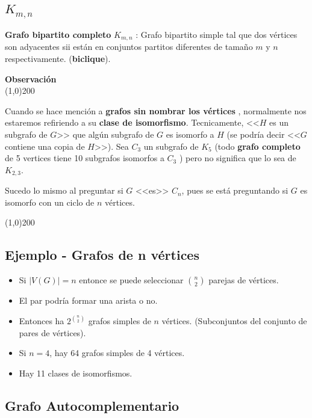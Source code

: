 \documentclass[a4paper]{book}
\newenvironment{obs}
    {
        \begin{flushleft}
       \textbf{Observación}\\
        \line(1,0){200} \\
        \end{flushleft}
    }
    {
        \begin{flushright}
        \line(1,0){200}
        \end{flushright}
    }
\begin{document}
\subsection{\(K_{m,n}\)}
\label{ssec:kmn}

\textbf{Grafo bipartito completo} \(K_{m,n}\) : Grafo bipartito simple tal que dos vértices son adyacentes sii están en conjuntos partitos diferentes de tamaño \(m\) y \(n\) respectivamente. (\textbf{biclique}).

\begin{obs}
    Cuando se hace mención a \textbf{grafos sin nombrar los vértices} ,
    normalmente nos estaremos refiriendo a su \textbf{clase de isomorfismo}.
    Tecnicamente, <<\(H\) es un subgrafo de \(G\)>> que algún subgrafo  de \(G\)
    es isomorfo a \(H\) (se podría decir <<\(G\) contiene una copia de
    \(H\)>>). Sea \(C_3\)  un subgrafo de \(K_5\) (todo \textbf{grafo completo}
    de 5 vertices tiene 10 subgrafos isomorfos a \(C_3\) ) pero no significa
    que lo sea de \(K_{2,3}\).

    Sucedo lo mismo al preguntar si \(G\) <<es>> \(C_{n}\), pues se está
    preguntando si \(G\) es isomorfo con un ciclo de \(n\) vértices.
\end{obs}


\subsection{Ejemplo - Grafos de n vértices}
\label{ssec:ejemplo_grafos_de_n_vertices}

\begin{itemize}
    \item Si \(|V\left( G \right)|=n \) entonce se puede seleccionar
        \({n}\choose{2}\) parejas de vértices.
    \item El par podría formar una arista o no.
    \item Entonces ha \(2^{{n}\choose{2}}\) grafos simples de  \(n\) vértices. (Subconjuntos del conjunto de pares de vértices).
    \item Si \(n=4\), hay 64 grafos simples de 4 vértices.
        \item Hay 11 clases de isomorfismos.
\end{itemize}

\subsection{Grafo Autocomplementario}
\label{ssec:grafo_autocomplementario}
\end{document}
